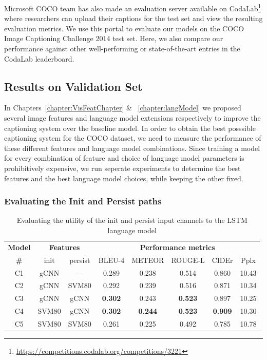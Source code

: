 Microsoft COCO team has also made an evaluation server available on
CodaLab\footnote{\url{https://competitions.codalab.org/competitions/3221}} where
researchers can upload their captions for the test set and view the resulting
evaluation metrics.
We use this portal to evaluate our models on the COCO Image Captioning Challenge
2014 test set. 
Here, we also compare our performance against other well-performing or
state-of-the-art entries in the CodaLab leaderboard.

\subsection{Results on Validation Set}
In Chapters~\ref{chapter:VisFeatChapter} \& ~\ref{chapter:langModel} we proposed
several image features and language model extensions respectively to improve the
captioning system over the baseline model.
In order to obtain the best posssible captioning system for the COCO dataset, we
need to measure the performance of these different features and language model
combinations.
Since training a model for every combination of feature and choice of language
model parameters is prohibitively expensive, we run seperate experiments to
determine the best features and the best language model choices, while keeping
the other fixed.
\subsubsection{Evaluating the Init and Persist paths}
\label{subsubsec:InitVpersist}
\begin{table}[htp]
  \centering
  \newcommand{\bs}{\small}
  \begin{adjustbox}{center}
  \begin{tabular}{|c||c|c||c|c|c|c|c|}
    \hline
    \bf Model & \multicolumn{2}{c||}{\bf Features 
    } & \multicolumn{5}{c|}{\bf Performance metrics}\\
     \cline{2-8}
    \bf \# & init & persist &\bs BLEU-4 &\bs METEOR &\bs ROUGE-L &\bs CIDEr&\bs Pplx \\\hline
    C1 & gCNN  & ---  & 0.289 & 0.238 & 0.514 & 0.860 & 10.43  \\
    C2 & gCNN  & SVM80& 0.292 & 0.239 & 0.516 & 0.871 & 10.34  \\
    C3 & gCNN  & gCNN &\bf 0.302 & 0.243 &\bf 0.523 & 0.897 & 10.25  \\
    C4 & SVM80 & gCNN &\bf 0.302 &\bf0.244 &\bf 0.523 &\bf0.909 & 10.30  \\
    C5 & SVM80 & SVM80& 0.261 & 0.225 & 0.492 & 0.785 & 10.78 \\\hline
  \end{tabular}
  \end{adjustbox}
  \caption{ Evaluating the utility of the init and persist input channels to the
          LSTM language model}
  \label{tab:resCocInitVPers}
\end{table}

